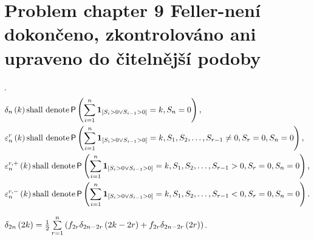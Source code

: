 \section{Problem chapter 9 Feller-není dokončeno, zkontrolováno ani upraveno do čitelnější podoby}
\begin{defn}\label{defn-delta_epsilon}
 \Lrws.
 \[
    \begin{split}
      & \delta_{n}\left( k\right) \text{shall denote} \pr\left(\suma \indikator{S_i>0 \lor S_{i-1}>0}=k, S_n=0 \right),\\
      & \varepsilon_{n}^r\left(k \right) \text{shall denote} \pr\left(\suma \indikator{S_i>0 \lor S_{i-1}>0}=k, S_1, S_2, \ldots, S_{r-1}\neq 0, S_r=0, S_n=0 \right),\\
      & \varepsilon_{n}^{r,+}\left(k \right) \text{shall denote} \pr\left(\suma \indikator{S_i>0 \lor S_{i-1}>0}=k, S_1, S_2, \ldots, S_{r-1} > 0, S_r=0, S_n=0 \right),\\
      & \varepsilon_{n}^{r,-}\left(k \right) \text{shall denote} \pr\left(\suma \indikator{S_i>0 \lor S_{i-1}>0}=k, S_1, S_2, \ldots, S_{r-1} < 0, S_r=0, S_n=0 \right).
    \end{split}
 \]
\end{defn}
\begin{lemma}\label{lemma-factorization_lemma}
 $\delta_{2n}\left( 2k\right)
 =\h \suma[r][1][n]\left( f_{2r} \delta_{2n-2r}\left(2k-2r\right)+f_{2r} \delta_{2n-2r}\left( 2r \right)\right)$.
\end{lemma}
